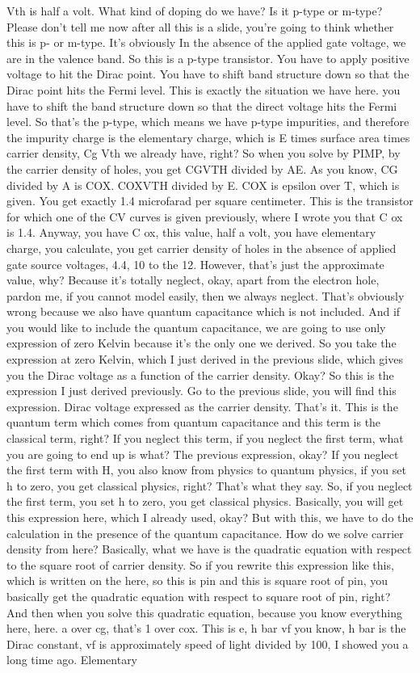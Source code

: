 Vth is half a volt. What kind of doping do we have? Is it p-type or m-type? Please don't tell me now after all this is a slide, you're going to think whether this is p- or m-type. It's obviously In the absence of the applied gate voltage, we are in the valence band. So this is a p-type transistor. You have to apply positive voltage to hit the Dirac point. You have to shift band structure down so that the Dirac point hits the Fermi level. This is exactly the situation we have here. you have to shift the band structure down so that the direct voltage hits the Fermi level. So that's the p-type, which means we have p-type impurities, and therefore the impurity charge is the elementary charge, which is E times surface area times carrier density, Cg Vth we already have, right? So when you solve by PIMP, by the carrier density of holes, you get CGVTH divided by AE. As you know, CG divided by A is COX. COXVTH divided by E. COX is epsilon over T, which is given. You get exactly 1.4 microfarad per square centimeter. This is the transistor for which one of the CV curves is given previously, where I wrote you that C ox is 1.4. Anyway, you have C ox, this value, half a volt, you have elementary charge, you calculate, you get carrier density of holes in the absence of applied gate source voltages, 4.4, 10 to the 12. However, that's just the approximate value, why? Because it's totally neglect, okay, apart from the electron hole, pardon me, if you cannot model easily, then we always neglect. That's obviously wrong because we also have quantum capacitance which is not included. And if you would like to include the quantum capacitance, we are going to use only expression of zero Kelvin because it's the only one we derived. So you take the expression at zero Kelvin, which I just derived in the previous slide, which gives you the Dirac voltage as a function of the carrier density. Okay? So this is the expression I just derived previously. Go to the previous slide, you will find this expression. Dirac voltage expressed as the carrier density. That's it. This is the quantum term which comes from quantum capacitance and this term is the classical term, right? If you neglect this term, if you neglect the first term, what you are going to end up is what? The previous expression, okay? If you neglect the first term with H, you also know from physics to quantum physics, if you set h to zero, you get classical physics, right? That's what they say. So, if you neglect the first term, you set h to zero, you get classical physics. Basically, you will get this expression here, which I already used, okay? But with this, we have to do the calculation in the presence of the quantum capacitance. How do we solve carrier density from here? Basically, what we have is the quadratic equation with respect to the square root of carrier density. So if you rewrite this expression like this, which is written on the here, so this is pin and this is square root of pin, you basically get the quadratic equation with respect to square root of pin, right? And then when you solve this quadratic equation, because you know everything here, here. a over cg, that's 1 over cox. This is e, h bar vf you know, h bar is the Dirac constant, vf is approximately speed of light divided by 100, I showed you a long time ago. Elementary 